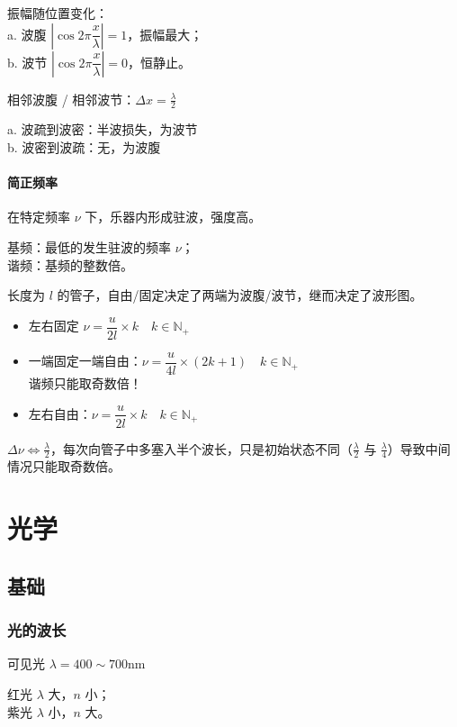 \documentclass[12pt, a4paper, UTF8, openany]{ctexbook}
\newcommand{\field}[1]{\mathbb{#1}}
\begin{document}
        振幅随位置变化：\\
        a. 波腹 $\left| \cos 2 \pi \dfrac{x}{\lambda} \right| = 1$，振幅最大；\\
        b. 波节 $\left| \cos 2 \pi \dfrac{x}{\lambda} \right| = 0$，恒静止。

        相邻波腹 / 相邻波节：$\Delta x = \frac{\lambda}{2}$

        a. 波疏到波密：半波损失，为波节 \\
        b. 波密到波疏：无，为波腹

        \subsubsection{简正频率}
        在特定频率 $\nu$ 下，乐器内形成驻波，强度高。

        基频：最低的发生驻波的频率 $\nu$；\\
        谐频：基频的整数倍。

        长度为 $l$ 的管子，自由/固定决定了两端为波腹/波节，继而决定了波形图。
        \begin{itemize}
            \item 左右固定 $\nu = \dfrac{u}{2l} \times k \quad k \in \field{N}_+$
            \item 一端固定一端自由：$\nu = \dfrac{u}{4l} \times (2k + 1) \quad k \in \field{N}_+$ \\
                谐频只能取{\heiti 奇数倍}！
            \item 左右自由：$\nu = \dfrac{u}{2l} \times k \quad k \in \field{N}_+$
        \end{itemize}

        $\Delta \nu \iff \frac{\lambda}{2}$，每次向管子中多塞入半个波长，只是初始状态不同（$\frac{\lambda}{2}$ 与 $\frac{\lambda}{4}$）导致中间情况只能取奇数倍。

    \chapter{光学}
    \section{基础}
        \subsection{光的波长}
        可见光 $\lambda = 400 \sim 700 \text{nm}$

        红光 $\lambda$ 大，$n$ 小；\\
        紫光 $\lambda$ 小，$n$ 大。
\end{document}
